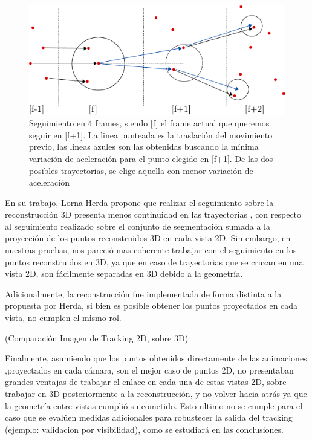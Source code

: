 \begin{figure}[hbt]
\begin{center}
\includegraphics[scale=0.8]{img/Tracking/tracking-eps-converted-to.pdf}
\end{center}
\caption{Seguimiento en 4 frames, siendo [f] el frame actual que queremos seguir en [f+1]. La linea punteada es la traslación del movimiento previo, las lineas azules son las obtenidas buscando la mínima variación de aceleración para el punto elegido en [f+1]. De las dos posibles trayectorias, se elige aquella con menor variación de aceleración}
\label{herda_00}
\end{figure}

En su trabajo\cite{herda}, Lorna Herda propone que realizar el seguimiento sobre la reconstrucción 3D presenta menos continuidad en las trayectorias , con respecto al seguimiento realizado sobre el conjunto de segmentación sumada a la proyección de los puntos reconstruidos 3D en cada vista 2D. Sin embargo, en nuestras pruebas, nos pareció mas coherente trabajar con el seguimiento en los puntos reconstruidos en 3D, ya que en caso de trayectorias que se cruzan en una vista 2D, son fácilmente separadas en 3D debido a la geometría. 

Adicionalmente, la reconstrucción fue implementada de forma distinta a la propuesta por Herda, si bien es posible obtener los puntos proyectados en cada vista, no cumplen el mismo rol. 

(Comparación Imagen de Tracking 2D, sobre 3D)

Finalmente, asumiendo que los puntos obtenidos directamente de las animaciones ,proyectados en cada cámara, son el mejor caso de puntos 2D, no presentaban grandes ventajas de trabajar el enlace en cada una de estas vistas 2D, sobre trabajar en 3D posteriormente a la reconstrucción, y no volver hacia atrás ya que la geometría entre vistas cumplió su cometido. Esto ultimo no se cumple para el caso que se evalúen medidas adicionales para robustecer la salida del tracking (ejemplo: validacion por visibilidad), como se estudiará en las conclusiones.

